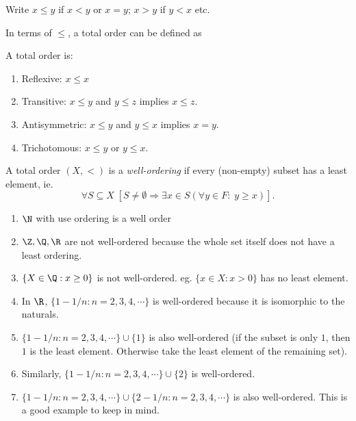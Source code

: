 \documentclass[a4paper]{article}
\begin{document}
\begin{notation}
  Write $x \leq y$ if $x < y$ or $x = y$; $x > y$ if $y < x$ etc.
\end{notation}

In terms of $\leq$, a total order can be defined as
\begin{defi}
  A total order is:
  \begin{enumerate}
    \item Reflexive: $x \leq x$
    \item Transitive: $x\leq y$ and $y \leq z$ implies $x\leq z$.
    \item Antisymmetric: $x\leq y$ and $y\leq x$ implies $x = y$.
    \item Trichotomous: $x\leq y$ or $y\leq x$.
  \end{enumerate}
\end{defi}

\begin{defi}
  A total order $(X, <)$ is a \emph{well-ordering} if every (non-empty) subset has a least element, ie.
  \[
    \forall S\subseteq X\; [S\not= \emptyset \Rightarrow  \exists x\in S (\forall y\in F:\; y \geq x)].
  \]
\end{defi}

\begin{eg}
  \begin{enumerate}
    \item $\N$ with use ordering is a well order
    \item $\Z, \Q, \R$ are not well-ordered because the whole set itself does not have a least ordering.
    \item $\{X\in \Q: x\geq 0\}$ is not well-ordered. eg. $\{x\in X: x> 0\}$ has no least element.
    \item In $\R$, $\{1 - 1/n: n = 2, 3, 4, \cdots\}$ is well-ordered because it is isomorphic to the naturals.
    \item $\{1- 1/n: n = 2, 3, 4, \cdots\} \cup \{1\}$ is also well-ordered (if the subset is only $1$, then $1$ is the least element. Otherwise take the least element of the remaining set).
    \item Similarly, $\{1 - 1/n: n = 2, 3, 4, \cdots\}\cup \{2\}$ is well-ordered.
    \item $\{1 - 1/n: n = 2, 3, 4, \cdots\} \cup \{2 - 1/n: n = 2, 3, 4, \cdots\}$ is also well-ordered. This is a good example to keep in mind.
  \end{enumerate}
\end{eg}
\end{document}
